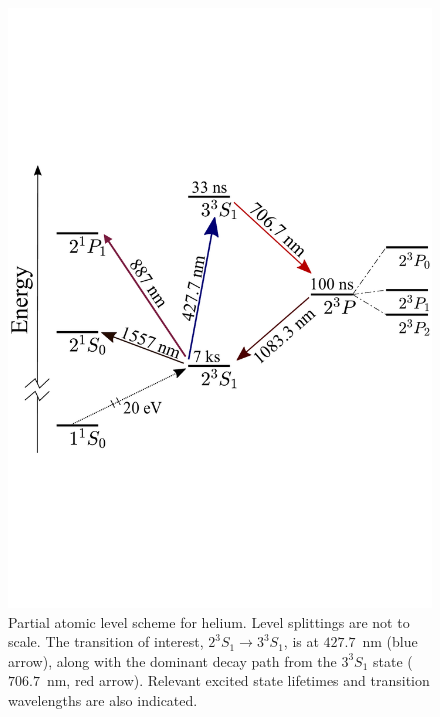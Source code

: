 \documentclass[%
 reprint,
 amsmath,amssymb,
 aps,
 prl,
]{revtex4-2}
\newcommand{\UpperState}{3^{3\!}S_1}%
\newcommand{\MetastableState}{2^{3\!}S_1}%
\begin{document}
\begin{figure}[b]
    \centering
    \includegraphics[width=\linewidth]{level_scheme_v5}
    \caption{Partial atomic level scheme for helium. Level splittings are not to scale. The transition of interest, \(\MetastableState \rightarrow \UpperState\), is at \(427.7\)~nm (blue arrow), along with the dominant decay path from the \(\UpperState\) state (\(706.7\)~nm, red arrow). Relevant excited state lifetimes and transition wavelengths are also indicated.
    }
    \label{fig:level_diagram}
\end{figure}
\end{document}
